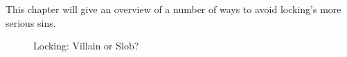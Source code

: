This chapter will give an overview of a number of ways to avoid locking's
more serious sins.

\begin{figure}[tb]
\centering
{}
\caption{Locking: Villain or Slob?}
\end{figure}

